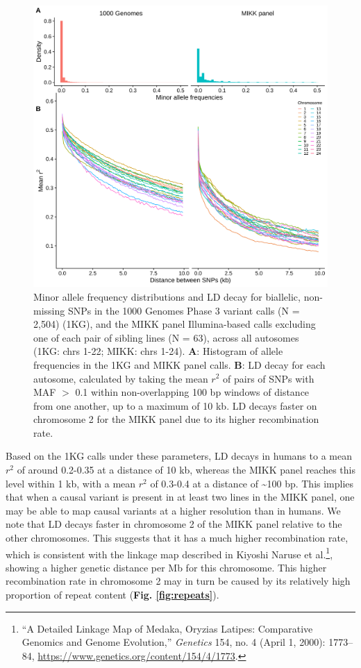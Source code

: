 \documentclass[
]{book}
\begin{document}
\begin{figure}
\includegraphics[width=1\linewidth]{figs/mikk_genome/08_ld_decay} \caption{Minor allele frequency distributions and LD decay for biallelic, non-missing SNPs in the 1000 Genomes Phase 3 variant calls (N = 2,504) (1KG), and the MIKK panel Illumina-based calls excluding one of each pair of sibling lines (N = 63), across all autosomes (1KG: chrs 1-22; MIKK: chrs 1-24). \textbf{A}: Histogram of allele frequencies in the 1KG and MIKK panel calls. \textbf{B}: LD decay for each autosome, calculated by taking the mean \(r^2\) of pairs of SNPs with MAF \(>\) 0.1 within non-overlapping 100 bp windows of distance from one another, up to a maximum of 10 kb. LD decays faster on chromosome 2 for the MIKK panel due to its higher recombination rate.}\label{fig:LDdecay}
\end{figure}

Based on the 1KG calls under these parameters, LD decays in humans to a mean \(r^2\) of around 0.2-0.35 at a distance of 10 kb, whereas the MIKK panel reaches this level within 1 kb, with a mean \(r^2\) of 0.3-0.4 at a distance of \textasciitilde100 bp. This implies that when a causal variant is present in at least two lines in the MIKK panel, one may be able to map causal variants at a higher resolution than in humans. We note that LD decays faster in chromosome 2 of the MIKK panel relative to the other chromosomes. This suggests that it has a much higher recombination rate, which is consistent with the linkage map described in Kiyoshi Naruse et al.\footnote{{``A {Detailed Linkage Map} of {Medaka}, {Oryzias} Latipes: {Comparative Genomics} and {Genome Evolution},''} \emph{Genetics} 154, no. 4 (April 1, 2000): 1773--84, \url{https://www.genetics.org/content/154/4/1773}.}, showing a higher genetic distance per Mb for this chromosome. This higher recombination rate in chromosome 2 may in turn be caused by its relatively high proportion of repeat content (\textbf{Fig. \ref{fig:repeats}}).
\end{document}
